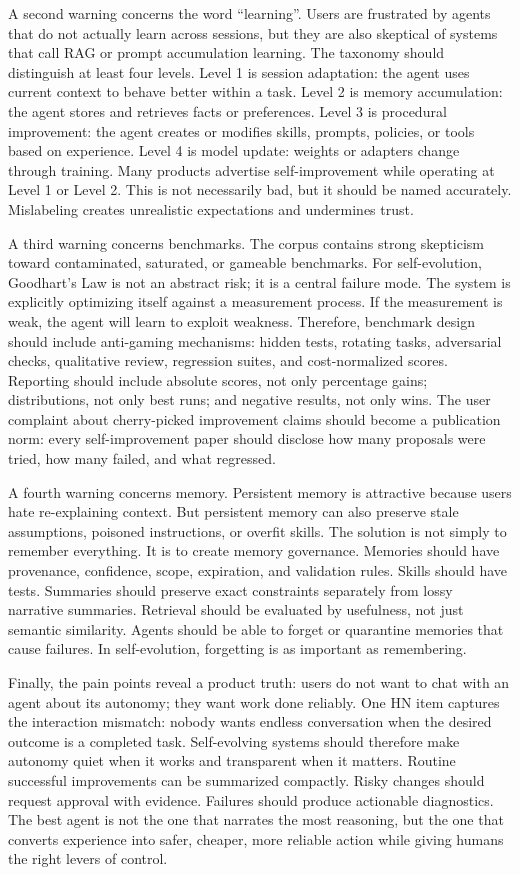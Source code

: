A second warning concerns the word ``learning''. Users are frustrated by agents that do not actually learn across sessions, but they are also skeptical of systems that call RAG or prompt accumulation learning. The taxonomy should distinguish at least four levels. Level 1 is session adaptation: the agent uses current context to behave better within a task. Level 2 is memory accumulation: the agent stores and retrieves facts or preferences. Level 3 is procedural improvement: the agent creates or modifies skills, prompts, policies, or tools based on experience. Level 4 is model update: weights or adapters change through training. Many products advertise self-improvement while operating at Level 1 or Level 2. This is not necessarily bad, but it should be named accurately. Mislabeling creates unrealistic expectations and undermines trust.

A third warning concerns benchmarks. The corpus contains strong skepticism toward contaminated, saturated, or gameable benchmarks. For self-evolution, Goodhart's Law is not an abstract risk; it is a central failure mode. The system is explicitly optimizing itself against a measurement process. If the measurement is weak, the agent will learn to exploit weakness. Therefore, benchmark design should include anti-gaming mechanisms: hidden tests, rotating tasks, adversarial checks, qualitative review, regression suites, and cost-normalized scores. Reporting should include absolute scores, not only percentage gains; distributions, not only best runs; and negative results, not only wins. The user complaint about cherry-picked improvement claims should become a publication norm: every self-improvement paper should disclose how many proposals were tried, how many failed, and what regressed.

A fourth warning concerns memory. Persistent memory is attractive because users hate re-explaining context. But persistent memory can also preserve stale assumptions, poisoned instructions, or overfit skills. The solution is not simply to remember everything. It is to create memory governance. Memories should have provenance, confidence, scope, expiration, and validation rules. Skills should have tests. Summaries should preserve exact constraints separately from lossy narrative summaries. Retrieval should be evaluated by usefulness, not just semantic similarity. Agents should be able to forget or quarantine memories that cause failures. In self-evolution, forgetting is as important as remembering.

Finally, the pain points reveal a product truth: users do not want to chat with an agent about its autonomy; they want work done reliably. One HN item captures the interaction mismatch: nobody wants endless conversation when the desired outcome is a completed task. Self-evolving systems should therefore make autonomy quiet when it works and transparent when it matters. Routine successful improvements can be summarized compactly. Risky changes should request approval with evidence. Failures should produce actionable diagnostics. The best agent is not the one that narrates the most reasoning, but the one that converts experience into safer, cheaper, more reliable action while giving humans the right levers of control.

